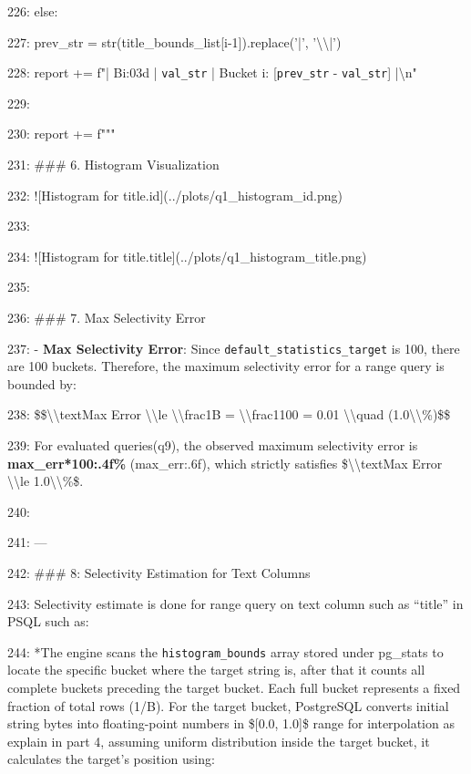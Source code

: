 \documentclass[11pt,a4paper]{article}
\begin{document}
226:         else:

227:             prev\_str = str(title\_bounds\_list[i-1]).replace('|', '\textbackslash{}\textbackslash{}|')

228:             report += f"| B{i:03d} | \texttt{{val\_str}} | Bucket {i}: [\texttt{{prev\_str}} - \texttt{{val\_str}}] |\textbackslash{}n"

229:

230:     report += f"""

231: \#\#\# 6. Histogram Visualization

232: ![Histogram for title.id](../plots/q1\_histogram\_id.png)

233:

234: ![Histogram for title.title](../plots/q1\_histogram\_title.png)

235:

236: \#\#\# 7. Max Selectivity Error

237: - \textbf{Max Selectivity Error}: Since \texttt{default\_statistics\_target} is 100, there are 100 buckets. Therefore, the maximum selectivity error for a range query is bounded by:

238: \$\$\textbackslash{}\textbackslash{}text{{Max Error}} \textbackslash{}\textbackslash{}le \textbackslash{}\textbackslash{}frac{{1}}{{B}} = \textbackslash{}\textbackslash{}frac{{1}}{{100}} = 0.01 \textbackslash{}\textbackslash{}quad (1.0\textbackslash{}\textbackslash{}\%)\$\$

239: For evaluated queries(q9), the observed maximum selectivity error is \textbf{{max\_err*100:.4f}\%} ({max\_err:.6f}), which strictly satisfies \$\textbackslash{}\textbackslash{}text{{Max Error}} \textbackslash{}\textbackslash{}le 1.0\textbackslash{}\textbackslash{}\%\$.

240:

241: ---

242: \#\#\# 8: Selectivity Estimation for Text Columns

243: Selectivity estimate is done for range query on text column such as “title” in PSQL such as:

244: *The engine scans the \texttt{histogram\_bounds} array stored under pg\_stats to locate the specific bucket where the target string  is, after that it counts all complete buckets preceding the target bucket. Each full bucket represents a fixed fraction of total rows (1/B). For the target bucket, PostgreSQL converts initial string bytes into floating-point numbers in \$[0.0, 1.0]\$ range for interpolation as explain in part 4,  assuming uniform distribution inside the target bucket, it calculates the target's position using:
\end{document}
